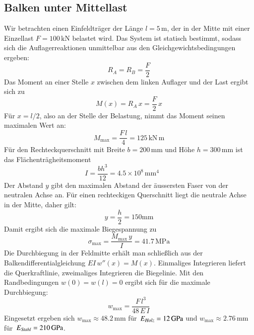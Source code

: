 \subsection{Balken unter Mittellast}
Wir betrachten einen Einfeldträger der Länge \(l = 5\,\mathrm{m}\), der in der Mitte mit einer Einzellast \(F = 100\,\mathrm{kN}\) belastet wird. 
Das System ist statisch bestimmt, sodass sich die Auflagerreaktionen unmittelbar aus den Gleichgewichtsbedingungen ergeben:
\[
  R_A = R_B = \frac{F}{2}
\]
Das Moment an einer Stelle \(x\) zwischen dem linken Auflager und der Last ergibt sich zu
\[
  M(x) = R_A \, x = \frac{F}{2}\,x
\]
Für \(x=l/2\), also an der Stelle der Belastung, nimmt das Moment seinen 
maximalen Wert an:
\begin{equation}
  M_{\max} = \frac{F\,l}{4} = 125\,\mathrm{kN\,m}
  \label{eq:Mmax}
\end{equation}
Für den Rechteckquerschnitt mit Breite \(b=200\,\mathrm{mm}\) 
und Höhe \(h=300\,\mathrm{mm}\) ist das Flächenträgheitsmoment
\[
  I = \frac{b h^3}{12} = 4.5 \times 10^8\,\mathrm{mm^4}
  \qquad 
\]
Der Abstand \(y\) gibt den maximalen Abstand der äussersten Faser von der neutralen Achse an. 
Für einen rechteckigen Querschnitt liegt die neutrale Achse 
in der Mitte, daher gilt:
\[
  y = \frac{h}{2}= 150\mathrm{mm}
\]
Damit ergibt sich die maximale Biegespannung zu
\begin{equation}
  \sigma_{\max} = \frac{M_{\max}\,y}{I} = 41.7\,\mathrm{MPa}
  \label{eq:sigma_max}
\end{equation}
Die Durchbiegung in der Feldmitte erhält man schließlich aus der Balkendifferentialgleichung \(EI\,w''(x)=M(x)\). 
Einmaliges Integrieren liefert die Querkraftlinie, zweimaliges Integrieren die Biegelinie. 
Mit den Randbedingungen \(w(0)=w(l)=0\) ergibt sich für die 
maximale Durchbiegung:
\begin{equation}
  w_{\max} = \frac{F\,l^3}{48\,E\,I}
  \label{eq:wmax}
\end{equation}
Eingesetzt ergeben sich 
\(w_{\max} \approx 48.2\,\mathrm{mm}\) für 
\(\,E_{\emph{Holz}}=12\,\mathrm{GPa}\)
und
\(w_{\max} \approx 2.76\,\mathrm{mm}\) für 
\(\,E_{\emph{Stahl}}=210\,\mathrm{GPa}\).
